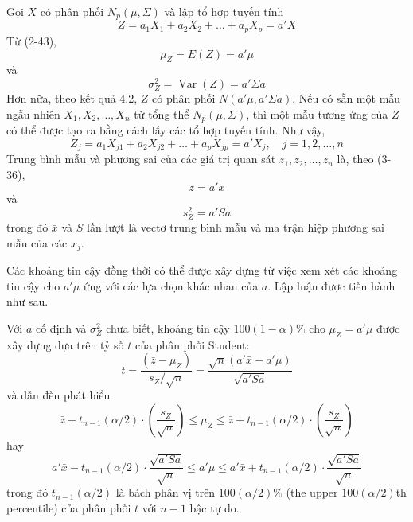Gọi $X$ có phân phối $N_p(\mu, \Sigma)$ và lập tổ hợp tuyến tính
\begin{equation*}
Z = a_1 X_1 + a_2 X_2 + \dots + a_p X_p = a'X
\end{equation*}
Từ (2-43),
\begin{equation*}
\mu_Z = E(Z) = a'\mu
\end{equation*}
và
\begin{equation*}
\sigma_Z^2 = \operatorname{Var}(Z) = a'\Sigma a
\end{equation*}
Hơn nữa, theo kết quả 4.2, $Z$ có phân phối $N(a'\mu, a'\Sigma a)$. Nếu có sẵn một mẫu ngẫu nhiên $X_1, X_2, \dots, X_n$ từ tổng thể $N_p(\mu, \Sigma)$, thì một mẫu tương ứng của $Z$ có thể được tạo ra bằng cách lấy các tổ hợp tuyến tính. Như vậy,
\begin{equation*}
Z_j = a_1 X_{j1} + a_2 X_{j2} + \dots + a_p X_{jp} = a'X_j, \quad j = 1, 2, \dots, n
\end{equation*}
Trung bình mẫu và phương sai của các giá trị quan sát $z_1, z_2, \dots, z_n$ là, theo (3-36),
\begin{equation*}
\bar{z} = a'\bar{x}
\end{equation*}
và
\begin{equation*}
s_Z^2 = a'Sa
\end{equation*}
trong đó $\bar{x}$ và $S$ lần lượt là vectơ trung bình mẫu và ma trận hiệp phương sai mẫu của các $x_j$.

Các khoảng tin cậy đồng thời có thể được xây dựng từ việc xem xét các khoảng tin cậy cho $a'\mu$ ứng với các lựa chọn khác nhau của $a$. Lập luận được tiến hành như sau.

Với $a$ cố định và $\sigma_Z^2$ chưa biết, khoảng tin cậy $100(1 - \alpha)\%$ cho $\mu_Z = a'\mu$ được xây dựng dựa trên tỷ số $t$ của phân phối Student:
\begin{equation}
t = \frac{(\bar{z} - \mu_Z)}{s_Z/\sqrt{n}} = \frac{\sqrt{n}(a'\bar{x} - a'\mu)}{\sqrt{a'Sa}} \tag{5-20}
\end{equation}
và dẫn đến phát biểu
\begin{equation*}
\bar{z} - t_{n-1}(\alpha/2) \cdot \left( \frac{s_Z}{\sqrt{n}} \right) \le \mu_Z \le \bar{z} + t_{n-1}(\alpha/2) \cdot \left( \frac{s_Z}{\sqrt{n}} \right)
\end{equation*}
hay
\begin{equation}
a'\bar{x} - t_{n-1}(\alpha/2) \cdot \frac{\sqrt{a'Sa}}{\sqrt{n}} \le a'\mu \le a'\bar{x} + t_{n-1}(\alpha/2) \cdot \frac{\sqrt{a'Sa}}{\sqrt{n}} \tag{5-21}
\end{equation}
trong đó $t_{n-1}(\alpha/2)$ là bách phân vị trên $100(\alpha/2)\%$ (the upper $100(\alpha/2)$th percentile) của phân phối $t$ với $n - 1$ bậc tự do.

